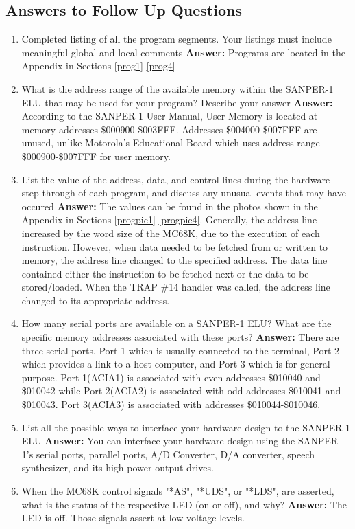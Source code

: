 \documentclass[12pt, twocolumn]{article}
\begin{document}
\subsection{Answers to Follow Up Questions}
\begin{enumerate}
	\item Completed listing of all the program segments. Your listings must include meaningful global and local comments
	\subitem \hspace{-0.7cm}\textbf{Answer:} Programs are located in the Appendix in Sections \ref{prog1}-\ref{prog4}
	\item What is the address range of the available memory within the \textsc{SANPER-1 ELU} that may be used for your program? Describe your answer
	\subitem \hspace{-0.7cm}\textbf{Answer:} According to the \textsc{SANPER-1} User Manual, User Memory is located at memory addresses \$000900-\$003FFF. Addresses \$004000-\$007FFF are unused, unlike Motorola's Educational Board which uses address range \$000900-\$007FFF for user memory.
	\item List the value of the address, data, and control lines during the hardware step-through of each program, and discuss any unusual events that may have occured
	\subitem \hspace{-0.7cm}\textbf{Answer:} The values can be found in the photos shown in the Appendix in Sections \ref{progpic1}-\ref{progpic4}. Generally, the address line increased by the word size of the MC68K, due to the execution of each instruction. However, when data needed to be fetched from or written to memory, the address line changed to the specified address. The data line contained either the instruction to be fetched next or the data to be stored/loaded. When the TRAP \#14 handler was called, the address line changed to its appropriate address. 
	\item How many serial ports are available on a \textsc{SANPER-1 ELU}? What are the specific memory addresses associated with these ports?
	\subitem \hspace{-0.7cm}\textbf{Answer:} There are three serial ports. Port 1 which is usually connected to the terminal, Port 2 which provides a link to a host computer, and Port 3 which is for general purpose. Port 1(ACIA1) is associated with even addresses \$010040 and \$010042 while Port 2(ACIA2) is associated with odd addresses \$010041 and \$010043. Port 3(ACIA3) is associated with addresses \$010044-\$010046. 
	\item List all the possible ways to interface your hardware design to the \textsc{SANPER-1 ELU}
	\subitem \hspace{-0.7cm}\textbf{Answer:} You can interface your hardware design using the \textsc{SANPER-1}'s serial ports, parallel ports, A/D Converter, D/A converter, speech synthesizer, and its high power output drives.
	\item When the MC68K control signals "*AS", "*UDS", or "*LDS", are asserted, what is the status of the respective LED (on or off), and why?
	\subitem \hspace{-0.7cm}\textbf{Answer:} The LED is off. Those signals assert at low voltage levels.
\end{enumerate}
\end{document}
